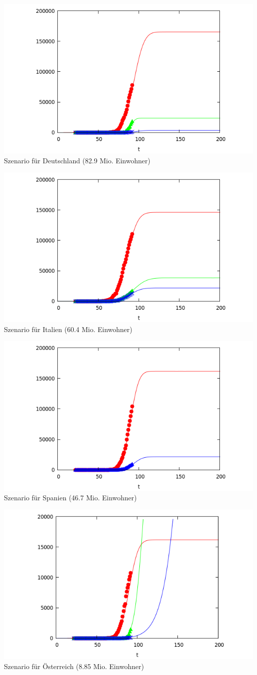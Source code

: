 \documentclass[a4paper,11pt]{article}
\begin{document}
\begin{center}
  \includegraphics[width=.8\textwidth]{Germany.png}\\[1em]
  {Szenario für Deutschland (82.9 Mio. Einwohner)}
  
  \includegraphics[width=.8\textwidth]{Italy.png}\\[1em]
  {Szenario für Italien (60.4 Mio. Einwohner)}

  \includegraphics[width=.8\textwidth]{Spain.png}\\[1em]
  {Szenario für Spanien (46.7 Mio. Einwohner)}
    
  \includegraphics[width=.8\textwidth]{Austria.png}\\[1em]
  {Szenario für Österreich (8.85 Mio. Einwohner)}
                  

\end{center}
\end{document}
